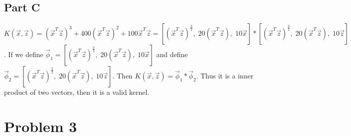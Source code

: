 \subsection{Part C}
$K(\vec{x},\vec{z})=(\vec{x}^T\vec{z})^3 + 400(\vec{x}^T\vec{z})^2 + 100 \vec{x}^T\vec{z}=[(\vec{x}^T\vec{z})^{\frac{3}{2}},\;20(\vec{x}^T\vec{z}),\;10\vec{x}]*[(\vec{x}^T\vec{z})^{\frac{3}{2}},\;20(\vec{x}^T\vec{z}),\;10\vec{z}]$. If we define $\vec{\phi}_1=[(\vec{x}^T\vec{z})^{\frac{3}{2}},\;20(\vec{x}^T\vec{z}),\;10\vec{x}]$ and define $\vec{\phi}_2=[(\vec{x}^T\vec{z})^{\frac{3}{2}},\;20(\vec{x}^T\vec{z}),\;10\vec{z}]$. Then $K(\vec{x},\vec{z})=\vec{\phi}_1*\vec{\phi}_2$. Thus it is a inner product of two vectors, then it is a valid kernel.

\section{Problem 3}
